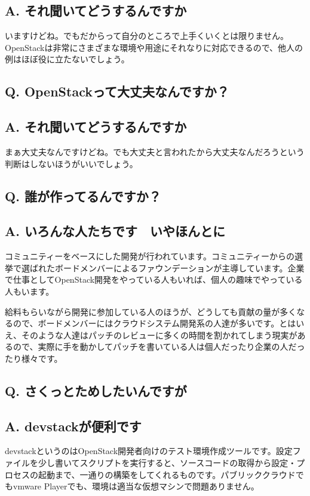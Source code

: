 \documentclass[9pt,b5paper,tombo,openany]{jsbook}
\begin{document}
\subsection*{{\bfseries A.} それ聞いてどうするんですか}
いますけどね。でもだからって自分のところで上手くいくとは限りません。OpenStackは非常にさまざまな環境や用途にそれなりに対応できるので、他人の例はほぼ役に立たないでしょう。

\subsection*{{\bfseries Q.} OpenStackって大丈夫なんですか？}
\subsection*{{\bfseries A.} それ聞いてどうするんですか}
まぁ大丈夫なんですけどね。でも大丈夫と言われたから大丈夫なんだろうという判断はしないほうがいいでしょう。

\subsection*{{\bfseries Q.} 誰が作ってるんですか？}
\subsection*{{\bfseries A.} いろんな人たちです　いやほんとに}
コミュニティーをベースにした開発が行われています。コミュニティーからの選挙で選ばれたボードメンバーによるファウンデーションが主導しています。企業で仕事としてOpenStack開発をやっている人もいれば、個人の趣味でやっている人もいます。

給料もらいながら開発に参加している人のほうが、どうしても貢献の量が多くなるので、ボードメンバーにはクラウドシステム開発系の人達が多いです。とはいえ、そのような人達はパッチのレビューに多くの時間を割かれてしまう現実があるので、実際に手を動かしてパッチを書いている人は個人だったり企業の人だったり様々です。

\subsection*{{\bfseries Q.} さくっとためしたいんですが}
\subsection*{{\bfseries A.} devstackが便利です}
devstackというのはOpenStack開発者向けのテスト環境作成ツールです。設定ファイルを少し書いてスクリプトを実行すると、ソースコードの取得から設定・プロセスの起動まで、一通りの構築をしてくれるものです。パブリッククラウドでもvmware Playerでも、環境は適当な仮想マシンで問題ありません。
\end{document}
